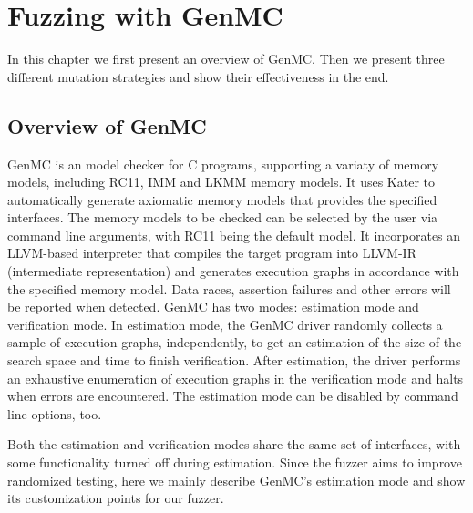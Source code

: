 \chapter{\label{cha:genmc}Fuzzing with GenMC}


In this chapter we first present an overview of GenMC. Then we present three different mutation strategies and show their effectiveness in the end.

\section{Overview of GenMC}

GenMC is an model checker for C programs, supporting a variaty of memory models, including RC11\cite{RC11}, IMM\cite{IMM} and LKMM\cite{LKMM} memory models. It uses Kater\cite{Kater} to automatically generate axiomatic memory models that provides the specified interfaces. The memory models to be checked can be selected by the user via command line arguments, with RC11 being the default model. It incorporates an LLVM-based interpreter that compiles the target program into LLVM-IR (intermediate representation) and generates execution graphs in accordance with the specified memory model. Data races, assertion failures and other errors will be reported when detected. GenMC has two modes: estimation mode and verification mode. In estimation mode, the GenMC driver randomly collects a sample of execution graphs, independently, to get an estimation of the size of the search space and time to finish verification. After estimation, the driver performs an exhaustive enumeration of execution graphs in the verification mode and halts when errors are encountered. The estimation mode can be disabled by command line options, too.

Both the estimation and verification modes share the same set of interfaces, with some functionality turned off during estimation. Since the fuzzer aims to improve randomized testing, here we mainly describe GenMC's estimation mode and show its customization points for our fuzzer.

